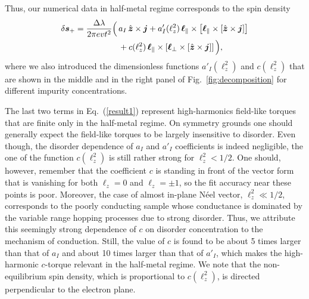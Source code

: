 Thus, our numerical data in half-metal regime corresponds to the spin density
\begin{align}
\label{result1}
\delta\boldsymbol{s}_+= \frac{\Delta\lambda}{2\pi evt^2}
\Big(\,&a_I\,\hat{\boldsymbol{z}}\times \boldsymbol{j} + a'_I(\ell_z^2)\,\boldsymbol{\ell}_\parallel\times \left[\boldsymbol{\ell}_\parallel\times \left[\hat{\boldsymbol{z}}\times\boldsymbol{j}\right]\right]\nonumber\\
&+c(\ell_z^2)\,\boldsymbol{\ell}_\parallel\times \left[\boldsymbol{\ell}_\perp\times \left[\hat{\boldsymbol{z}}\times\boldsymbol{j}\right]\right]\Big),
\end{align}
where we also introduced the dimensionless functions $a'_I(\ell_z^2)$ and $c(\ell_z^2)$ that are shown in the middle and in the right panel of Fig.~\ref{fig:decomposition} for different impurity concentrations. 

The last two terms in Eq.~(\ref{result1}) represent high-harmonics field-like torques that are finite only in the half-metal regime. On symmetry grounds one should generally expect the field-like torques to be largely insensitive to disorder. Even though, the disorder dependence of $a_I$ and $a'_I$ coefficients is indeed negligible, the one of the function $c(\ell_z^2)$ is still rather strong for $\ell_z^2<1/2$. One should, however, remember that the coefficient $c$ is standing in front of the vector form that is vanishing for both $\ell_z=0$ and $\ell_z=\pm 1$, so the fit accuracy near these points is poor. Moreover, the case of almost in-plane N\'eel vector, $\ell_z^2\ll 1/2$, corresponds to the poorly conducting sample whose conductance is dominated by the variable range hopping processes due to strong disorder. Thus, we attribute this seemingly strong dependence of $c$ on disorder concentration to the mechanism of conduction. Still, the value of $c$ is found to be about 5 times larger than that of $a_I$ and about 10 times larger than that of $a'_I$, which makes the high-harmonic $c$-torque relevant in the half-metal regime. We note that the non-equilibrium spin density, which is proportional to $c(\ell_z^2)$, is directed perpendicular to the electron plane.  

